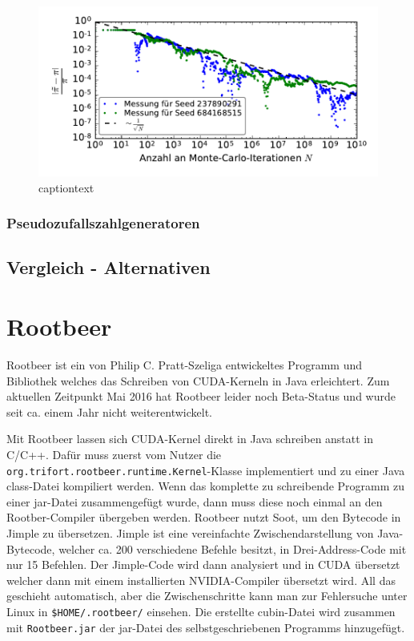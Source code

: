 \documentclass[german,bibnum,beleg,zihtitle,german,hyperref,utf8]{zihpub}
\begin{document}
\begin{figure}
	\centering
	\begin{minipage}{0.7\linewidth}
		\includegraphics[width=\linewidth]{monte-carlo-pi-error-scaling}
	\end{minipage}
	\caption{captiontext}
	\label{fig:monteerrorfloat}
\end{figure}


\subsection{Pseudozufallszahlgeneratoren}


\section{Vergleich - Alternativen}


\chapter{Rootbeer}
\label{sct:rootbeer}

Rootbeer\cite{pratt2012rootbeer} ist ein von Philip C. Pratt-Szeliga entwickeltes Programm und Bibliothek welches das Schreiben von CUDA-Kerneln in Java erleichtert. Zum aktuellen Zeitpunkt Mai 2016 hat Rootbeer leider noch Beta-Status und wurde seit ca. einem Jahr nicht weiterentwickelt\cite{rootbeergithub}.

Mit Rootbeer lassen sich CUDA-Kernel direkt in Java schreiben anstatt in C/C++. Dafür muss zuerst vom Nutzer die \texttt{org.trifort.rootbeer.runtime.Kernel}-Klasse implementiert und zu einer Java class-Datei kompiliert werden. 
Wenn das komplette zu schreibende Programm zu einer jar-Datei zusammengefügt wurde, dann muss diese noch einmal an den Rootber-Compiler übergeben werden. Rootbeer nutzt Soot\cite{sootsite,sootretrospective}, um den Bytecode in Jimple zu übersetzen. Jimple ist eine vereinfachte Zwischendarstellung von Java-Bytecode, welcher ca. 200 verschiedene Befehle besitzt, in Drei-Address-Code mit nur 15 Befehlen.
Der Jimple-Code wird dann analysiert und in CUDA übersetzt welcher dann mit einem installierten NVIDIA-Compiler übersetzt wird. All das geschieht automatisch, aber die Zwischenschritte kann man zur Fehlersuche unter Linux in \lstinline!$HOME/.rootbeer/! einsehen.
Die erstellte cubin-Datei wird zusammen mit \texttt{Rootbeer.jar} der jar-Datei des selbstgeschriebenen Programms hinzugefügt.
\end{document}
